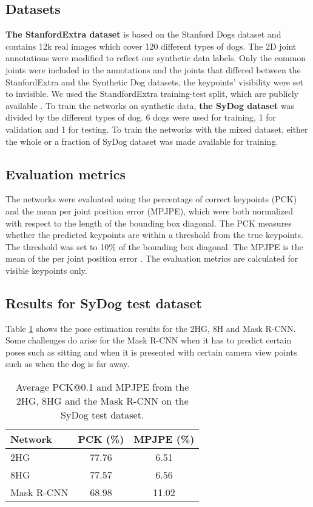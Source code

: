 \documentclass[final]{cvpr}
\begin{document}
\subsection{Datasets}
\textbf{The StanfordExtra dataset} \cite{biggs2020left} is based on the Stanford Dogs dataset \cite{KhoslaYaoJayadevaprakashFeiFei_FGVC2011} and contains 12k real images which cover 120 different types of dogs. The 2D joint annotations were modified to reflect our synthetic data labels. Only the common joints were included in the annotations and the joints that differed between the StanfordExtra and the Synthetic Dog datasets, the keypoints' visibility were set to invisible. We used the StandfordExtra training-test split, which are publicly available \cite{biggs2020wldo}.
To train the networks on synthetic data, \textbf{the SyDog dataset} was divided by the different types of dog. 6 dogs were used for training, 1 for validation and 1 for testing. To train the networks with the mixed dataset, either the whole or a fraction of SyDog dataset was made available for training.
\subsection{Evaluation metrics}
The networks were evaluated using the percentage of correct keypoints (PCK) and the mean per joint position error (MPJPE), which were both normalized with respect to the length of the bounding box diagonal. The PCK measures whether the predicted keypoints are within a threshold from the true keypoints. The threshold was set to 10\% of the bounding box diagonal. The MPJPE is the mean of the per joint position error \cite{Li20143DHP}. The evaluation metrics are calculated for visible keypoints only.
\subsection{Results for SyDog test dataset} Table \ref{table:synthetic_data} shows the pose estimation results for the 2HG, 8H and Mask R-CNN. Some challenges do arise for the Mask R-CNN when it has to predict certain poses such as sitting and when it is presented with certain camera view points such as when the dog is far away. 
\begin{table}
\begin{center}
\begin{tabular}{|l|c|c|}
\hline
Network & PCK (\%) & MPJPE (\%) \\
\hline\hline
2HG & 77.76 & 6.51 \\
8HG & 77.57 & 6.56 \\
Mask R-CNN & 68.98 & 11.02 \\
\hline
\end{tabular}
\end{center}
\caption{Average PCK@0.1 and MPJPE from the 2HG, 8HG and the Mask R-CNN on the SyDog test dataset. \label{table:synthetic_data}}
\end{table}
\end{document}
